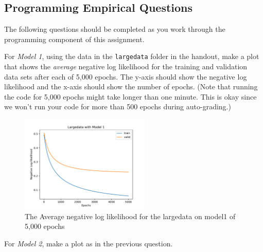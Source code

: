 \documentclass[11pt,addpoints,answers]{exam}
\begin{document}
\begin{questions}

\end{questions}

\clearpage


\subsection{Programming Empirical Questions}
\label{sec:empirical}

The following questions should be completed as you work through the programming component of this assignment.

\begin{questions}
\question[2]
For \emph{Model 1}, using the data in the \texttt{largedata} folder in the handout, make a plot that shows the \textit{average} negative log likelihood for the training and validation data sets after each of 5,000 epochs. The y-axis should show the negative log likelihood and the x-axis should show the number of epochs. (Note that running the code for 5,000 epochs might take longer than one minute. This is okay since we won't run your code for more than 500 epochs during auto-grading.)


\begin{your_solution}[height=8cm]

\begin{figure}[H]
    \centering
    \includegraphics[width = 0.55\textwidth]{./images/l_model1_5000eps.pdf}
    \caption{The Average negative log likelihood for the largedata on model1 of 5,000 epochs}
    \label{fig1}
\end{figure}

\begin{center}
\end{center}
\end{your_solution}
    

\question[2]
For \emph{Model 2}, make a plot as in the previous question.


\end{questions}
\end{document}
